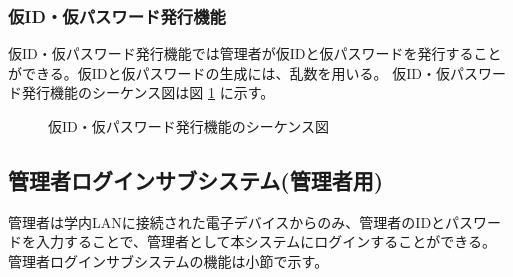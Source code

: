 \documentclass[a4j]{jarticle}
\begin{document}
   \subsubsection{仮ID・仮パスワード発行機能}
   仮ID・仮パスワード発行機能では管理者が仮IDと仮パスワードを発行することができる。仮IDと仮パスワードの生成には、乱数を用いる。 仮ID・仮パスワード発行機能のシーケンス図は図 \ref{fig:admin_user_id-pass.png} に示す。
                 \begin{figure}[H]
\centering
{}
\caption{仮ID・仮パスワード発行機能のシーケンス図}
\label{fig:admin_user_id-pass.png}
\end{figure}
 \subsection{管理者ログインサブシステム(管理者用)}
 管理者は学内LANに接続された電子デバイスからのみ、管理者のIDとパスワードを入力することで、管理者として本システムにログインすることができる。\\
 管理者ログインサブシステムの機能は小節で示す。
\end{document}
